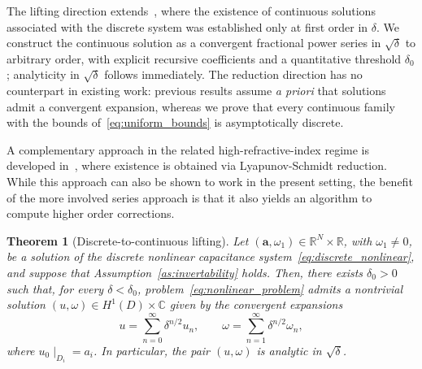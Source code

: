 \documentclass[a4paper,reqno,twoside]{amsart}
\numberwithin{equation}{section}
\newtheorem{theorem}{Theorem}[section]
\theoremstyle{definition}
\newcommand{\<}{\ensuremath \leq}
\renewcommand{\>}{\ensuremath \geq}
\begin{document}
The lifting direction extends~\cite{ammari2025analysis}, where the existence of 
continuous solutions associated with the discrete system was established 
only at first order in $\delta$. We construct the continuous solution as a 
convergent fractional power series in $\sqrt{\delta}$ to arbitrary order, with 
explicit recursive coefficients and a quantitative threshold $\delta_0$; 
analyticity in $\sqrt{\delta}$ follows immediately. The reduction direction 
has no counterpart in existing work: previous results assume \emph{a 
priori} that solutions admit a convergent expansion, whereas we prove 
that every continuous family with the bounds of~\eqref{eq:uniform_bounds} 
is asymptotically discrete.

A complementary approach in the related high-refractive-index regime is 
developed in~\cite{ammari2026dielectric}, where existence is obtained via 
Lyapunov-Schmidt reduction. While this approach can also be shown to work in the present setting, the benefit of the more involved series approach is that it also yields an algorithm to compute higher order corrections.


\begin{theorem}[Discrete-to-continuous lifting]\label{thm:approximation_convergence}
    Let $(\mathbf{a}, \omega_1) \in \mathbb{R}^N \times \mathbb{R}$,
    with $\omega_1 \neq 0$, be a solution of the discrete nonlinear
    capacitance system~\eqref{eq:discrete_nonlinear}, and suppose that
    Assumption~\ref{as:invertability} holds.
    Then, there exists $\delta_0 > 0$ such that, for every
    $\delta < \delta_0$, problem~\eqref{eq:nonlinear_problem} admits
    a nontrivial solution $(u, \omega) \in H^1(D) \times \mathbb{C}$
    given by the convergent expansions
    \begin{equation}
        u = \sum_{n=0}^{\infty} \delta^{n/2} u_n,
        \qquad
        \omega = \sum_{n=1}^{\infty} \delta^{n/2} \omega_n,
    \end{equation}
    where $u_0\mid_{D_i}=a_i$. In particular, the pair $(u,\omega)$ is analytic in $\sqrt{\delta}$.
\end{theorem}
\end{document}
